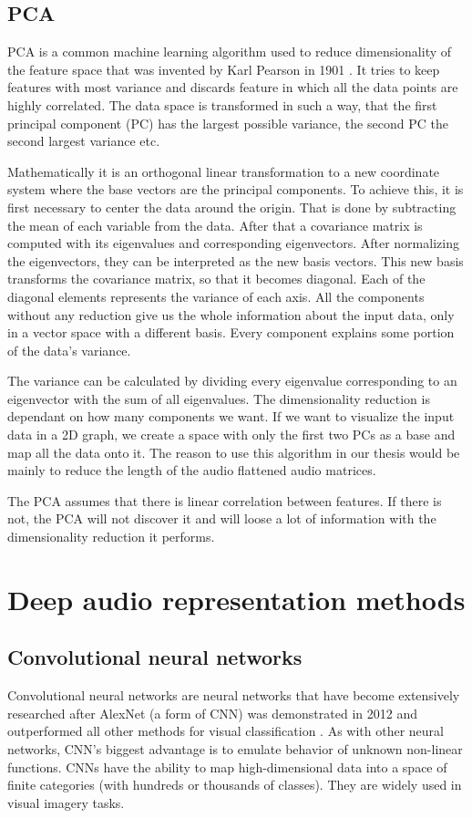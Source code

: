 \subsection{PCA}
PCA is a common machine learning algorithm used to reduce dimensionality of the feature space that was invented by Karl Pearson in 1901 \cite{doi:10.1080/14786440109462720}. It tries to keep features with most variance and discards feature in which all the data points are highly correlated. The data space is transformed in such a way, that the first principal component (PC) has the largest possible variance, the second PC the second largest variance etc. 

Mathematically it is an orthogonal linear transformation to a new coordinate system where the base vectors are the principal components. To achieve this, it is first necessary to center the data around the origin. That is done by subtracting the mean of each variable from the data. After that a covariance matrix is computed with its eigenvalues and corresponding eigenvectors. After normalizing the eigenvectors, they can be interpreted as the new basis vectors. This new basis transforms the covariance matrix, so that it becomes diagonal. Each of the diagonal elements represents the variance of each axis. All the components without any reduction give us the whole information about the input data, only in a vector space with a different basis. Every component explains some portion of the data's variance. 

The variance can be calculated by dividing every eigenvalue corresponding to an eigenvector with the sum of all eigenvalues. The dimensionality reduction is dependant on how many components we want. If we want to visualize the input data in a 2D graph, we create a space with only the first two PCs as a base and map all the data onto it. The reason to use this algorithm in our thesis would be mainly to reduce the length of the audio flattened audio matrices. 

The PCA assumes that there is linear correlation between features. If there is not, the PCA will not discover it and will loose a lot of information with the dimensionality reduction it performs.

\section{Deep audio representation methods}\label{sec:audio_deep_learning}

\subsection{Convolutional neural networks}
Convolutional neural networks are neural networks that have become extensively researched after AlexNet (a form of CNN) was demonstrated in 2012 and outperformed all other methods for visual classification \cite{Krizhevsky:2012:ICD:2999134.2999257}. As with other neural networks, CNN's biggest advantage is to emulate behavior of unknown non-linear functions. CNNs have the ability to map high-dimensional data into a space of finite categories (with hundreds or thousands of classes). They are widely used in visual imagery tasks. 

